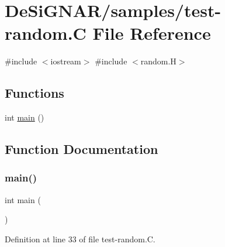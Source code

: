\hypertarget{test-random_8_c}{}\section{De\+Si\+G\+N\+A\+R/samples/test-\/random.C File Reference}
\label{test-random_8_c}
{\ttfamily \#include $<$iostream$>$}\newline
{\ttfamily \#include $<$random.\+H$>$}\newline
\subsection*{Functions}
\begin{DoxyCompactItemize}
\item 
int \hyperlink{test-random_8_c_ae66f6b31b5ad750f1fe042a706a4e3d4}{main} ()
\end{DoxyCompactItemize}


\subsection{Function Documentation}
\mbox{\label{test-random_8_c_ae66f6b31b5ad750f1fe042a706a4e3d4}} 
\subsubsection{\texorpdfstring{main()}{main()}}
{\footnotesize\ttfamily int main (\begin{DoxyParamCaption}{ }\end{DoxyParamCaption})}



Definition at line 33 of file test-\/random.\+C.

